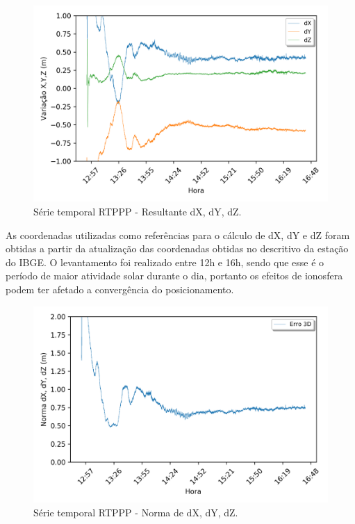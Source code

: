 \begin{figure}[H]
\centering
\includegraphics[scale=0.9]{data/Graphics/RJ_T20712/RJ_T20712_graphic_xyz.png}
\caption{Série temporal RTPPP - Resultante dX, dY, dZ.}
\label{}
\end{figure}

As coordenadas utilizadas como referências para o cálculo de dX, dY e dZ foram obtidas a partir da atualização das coordenadas obtidas no descritivo da estação do IBGE. O levantamento foi realizado entre 12h e 16h, sendo que esse é o período de maior atividade solar durante o dia, portanto os efeitos de ionosfera podem ter afetado a convergência do posicionamento.%

\begin{figure}[H]
\centering
\includegraphics[scale=0.9]{data/Graphics/RJ_T20712/RJ_T20712_graphic_result.png}
\caption{Série temporal RTPPP - Norma de dX, dY, dZ.}
\label{result_20712}
\end{figure}

